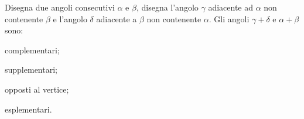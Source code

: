 \begin{esercizio}
\label{ese:1.83}
Disegna due angoli consecutivi $\alpha$ e $\beta$, disegna l'angolo 
$\gamma$ adiacente ad $\alpha$ non contenente $\beta$ e l'angolo 
$\delta$ adiacente a $\beta$ non contenente $\alpha$. Gli angoli 
$\gamma + \delta$ e $\alpha+\beta$ sono:
\begin{multicols}{2}
\begin{enumeratea}
\item complementari;
\item supplementari;
\item opposti al vertice;
\item esplementari.
\end{enumeratea}
\end{multicols}
\end{esercizio}

